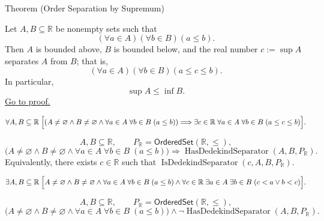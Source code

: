 \begin{theorembox}{Theorem (Order Separation by Supremum)}
\begin{theorem}
\label{thm:order-separation-by-supremum}
Let $A,B\subseteq\mathbb{R}$ be nonempty sets such that
\[
  (\forall a\in A)(\forall b\in B)(a\leq b).
\]
Then $A$ is bounded above, $B$ is bounded below, and the real number
$c:=\sup A$ separates $A$ from $B$; that is,
\[
  (\forall a\in A)(\forall b\in B)(a\leq c\leq b).
\]
In particular,
\[
  \sup A\leq\inf B.
\]
\hyperref[prf:order-separation-by-supremum]{Go to proof.}
\end{theorem}
\end{theorembox}
\begin{remark*}
\[
\forall A,B\subseteq\mathbb{R}\;
\Bigl[
(A\ne\varnothing\land B\ne\varnothing\land
\forall a\in A\;\forall b\in B\;(a\le b))
\Longrightarrow
\exists c\in\mathbb{R}\;\forall a\in A\;\forall b\in B\;(a\le c\le b)
\Bigr].
\]
\end{remark*}
\begin{remark*}
\[
A,B\subseteq\mathbb{R},\qquad P_{\mathbb{R}}=\mathsf{OrderedSet}(\mathbb{R},\leq),
\]
\[
\bigl(A\ne\varnothing\land B\ne\varnothing\land
\forall a\in A\;\forall b\in B\;(a\le b)\bigr)
\Longrightarrow
\operatorname{HasDedekindSeparator}(A,B,P_{\mathbb{R}}).
\]
Equivalently, there exists $c\in\mathbb{R}$ such that
\(\operatorname{IsDedekindSeparator}(c,A,B,P_{\mathbb{R}})\).
\end{remark*}
\begin{remark*}
\[
\exists A,B\subseteq\mathbb{R}\;
\Bigl[
A\ne\varnothing\land B\ne\varnothing\land
\forall a\in A\;\forall b\in B\;(a\le b)
\land
\forall c\in\mathbb{R}\;\exists a\in A\;\exists b\in B\;(c<a\lor b<c)
\Bigr].
\]
\end{remark*}
\begin{remark*}
\[
A,B\subseteq\mathbb{R},\qquad P_{\mathbb{R}}=\mathsf{OrderedSet}(\mathbb{R},\leq),
\]
\[
\bigl(A\ne\varnothing\land B\ne\varnothing\land
\forall a\in A\;\forall b\in B\;(a\le b)\bigr)
\land\neg\operatorname{HasDedekindSeparator}(A,B,P_{\mathbb{R}}).
\]
\end{remark*}

